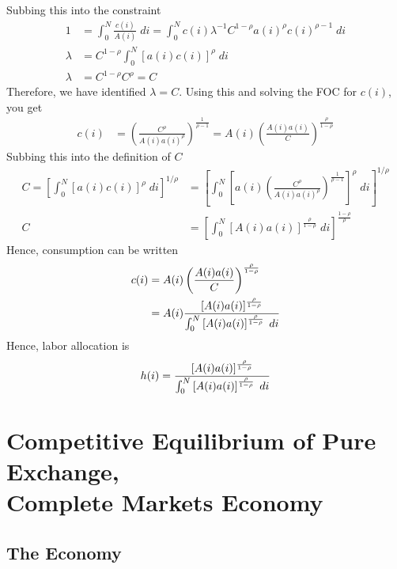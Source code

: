 \documentclass[12pt]{article}
\theoremstyle{plain}
\theoremstyle{definition}
\theoremstyle{remark}
\newcommand{\intzN}{\int_0^N}
\begin{document}
Subbing this into the constraint
\begin{align*}
  1&=
  \intzN \frac{c(i)}{A(i)} \; di
  =
  \intzN
    c(i)
    \lambda^{-1} C^{1-\rho} a(i)^\rho c(i)^{\rho-1}
    \; di \\
  \lambda &=
  C^{1-\rho}
  \intzN
    [a(i)c(i)]^{\rho}
    \; di \\
  \lambda &= C^{1-\rho} C^\rho = C
\end{align*}
Therefore, we have identified $\lambda = C$. Using this and solving the
FOC for $c(i)$, you get
\begin{align*}
  c(i)
  &=
  \left(
  \frac{C^{\rho}}{A(i)a(i)^\rho}
  \right)^{\frac{1}{\rho-1}}
  =
  A(i)
  \left(\frac{A(i)a(i)}{C}\right)^{\frac{\rho}{1-\rho}}
\end{align*}
Subbing this into the definition of $C$
\begin{align*}
  C
  = \left[ \int_0^N [a(i)c(i)]^\rho \; di \right]^{1/\rho}
  &=
  \left[ \int_0^N
    \left[a(i)
    \left(
    \frac{C^{\rho}}{A(i)a(i)^\rho}
    \right)^{\frac{1}{\rho-1}}
    \right]^\rho \; di \right]^{1/\rho} \\
  C
  &=
  \left[ \int_0^N
    \left[
    A(i)a(i)
    \right]^{\frac{\rho}{1-\rho}}
    \; di \right]^{\frac{1-\rho}{\rho}}
\end{align*}
Hence, consumption can be written
\begin{align*}
  c(i)
  &=
  A(i)
  \left(\frac{A(i)a(i)}{C}\right)^{\frac{\rho}{1-\rho}} \\
  &=
  A(i)
  \frac{[A(i)a(i)]^{\frac{\rho}{1-\rho}}}{%
    \int_0^N \left[ A(i)a(i) \right]^{\frac{\rho}{1-\rho}} \; di
  }
\end{align*}
Hence, labor allocation is
\begin{align*}
  h(i) =
  \frac{[A(i)a(i)]^{\frac{\rho}{1-\rho}}}{%
    \int_0^N \left[ A(i)a(i) \right]^{\frac{\rho}{1-\rho}} \; di
  }
\end{align*}


\clearpage
\section{%
  Competitive Equilibrium of Pure Exchange,\\
  Complete Markets Economy
}


\subsection{The Economy}
\end{document}
